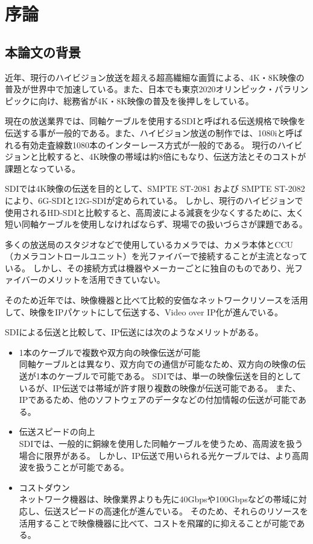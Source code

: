 \chapter{序論}
\label{chap:introduction}

\section{本論文の背景}
近年、現行のハイビジョン放送を超える超高繊細な画質による、4K・8K映像の普及が世界中で加速している。また、日本でも東京2020オリンピック・パラリンピックに向け、総務省が4K・8K映像の普及を後押しをしている。

現在の放送業界では、同軸ケーブルを使用するSDIと呼ばれる伝送規格で映像を伝送する事が一般的である。また、ハイビジョン放送の制作では、1080iと呼ばれる有効走査線数1080本のインターレース方式が一般的である。
現行のハイビジョンと比較すると、4K映像の帯域は約8倍にもなり、伝送方法とそのコストが課題となっている。

SDIでは4K映像の伝送を目的として、SMPTE ST-2081 および SMPTE ST-2082により、6G-SDIと12G-SDIが定められている。
しかし、現行のハイビジョンで使用されるHD-SDIと比較すると、高周波による減衰を少なくするために、太く短い同軸ケーブルを使用しなければならず、現場での扱いづらさが課題である。

多くの放送局のスタジオなどで使用しているカメラでは、カメラ本体とCCU（カメラコントロールユニット）を光ファイバーで接続することが主流となっている。
しかし、その接続方式は機器やメーカーごとに独自のものであり、光ファイバーのメリットを活用できていない。

そのため近年では、映像機器と比べて比較的安価なネットワークリソースを活用して、映像をIPパケットにして伝送する、Video over IP化が進んでいる。

SDIによる伝送と比較して、IP伝送には次のようなメリットがある\cite{kodera-interbee2015}。
\begin{itemize}
  \item 1本のケーブルで複数や双方向の映像伝送が可能\mbox{}\\
    同軸ケーブルとは異なり、双方向での通信が可能なため、双方向の映像の伝送が1本のケーブルで可能である。
    SDIでは、単一の映像伝送を目的としているが、IP伝送では帯域が許す限り複数の映像が伝送可能である。
    また、IPであるため、他のソフトウェアのデータなどの付加情報の伝送が可能である。
  \item 伝送スピードの向上\mbox{}\\
    SDIでは、一般的に銅線を使用した同軸ケーブルを使うため、高周波を扱う場合に限界がある。
    しかし、IP伝送で用いられる光ケーブルでは、より高周波を扱うことが可能である。
  \item コストダウン\mbox{}\\
    ネットワーク機器は、映像業界よりも先に40Gbpsや100Gbpsなどの帯域に対応し、伝送スピードの高速化が進んでいる。
    そのため、それらのリソースを活用することで映像機器に比べて、コストを飛躍的に抑えることが可能である。
\end{itemize}


